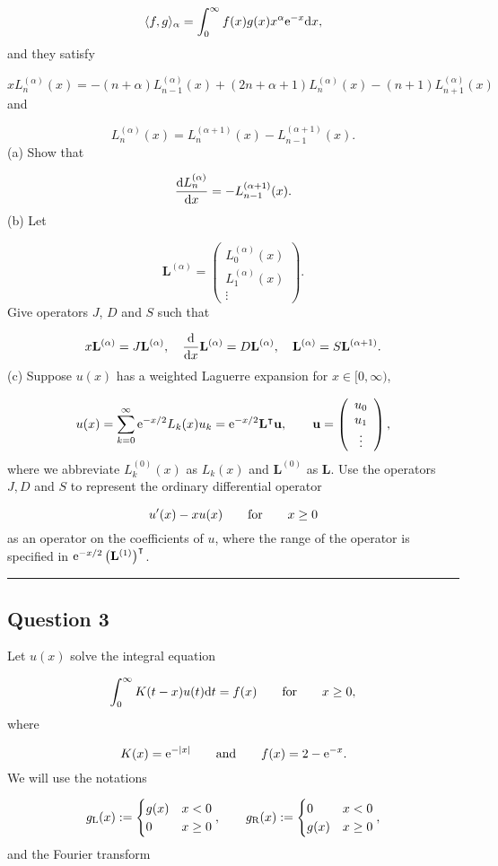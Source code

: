 \documentclass[12pt,a4paper]{article}
\def\qqfor{\qquad\hbox{for}\qquad}
\def\D{ {\rm d} }
\def\E{ {\rm e} }
\def\dx{\D x}
\def\dt{\D t}
\begin{document}
\[
\langle f,g\rangle_{\alpha} = \int_0^{\infty} f(x) g(x) x^{\alpha} \E^{-x}\D x,
\]
and they satisfy

\[
x L_n^{(\alpha)}(x) = - (n+\alpha)L_{n-1}^{(\alpha)}(x) + (2n+\alpha+1) L_n^{(\alpha)}(x) -(n+1)L_{n+1}^{(\alpha)}(x)
\]
and

\[
L_n^{(\alpha)}(x) = L_n^{(\alpha+1)}(x) - L_{n-1}^{(\alpha +1)}(x).
\]
(a) Show that

\[
{\D L_n^{(\alpha)} \over \dx}  = -L_{n-1}^{(\alpha+1)}(x).
\]
(b) Let

\[
\mathbf{L}^{(\alpha)} = \left(
\begin{array}{c}
L_0^{(\alpha)}(x) \\
L_1^{(\alpha)}(x) \\
\vdots
\end{array}
\right).
\]
Give operators $J$, $D$ and $S$ such that

\[
x\mathbf{L}^{(\alpha)} = J\mathbf{L}^{(\alpha)}, \quad
{\D\over \D x}\mathbf{L}^{(\alpha)} = D\mathbf{L}^{(\alpha)}, \quad
\mathbf{L}^{(\alpha)} = S \mathbf{L}^{(\alpha+1)}.
\]
(c) Suppose $u(x)$ has a weighted Laguerre expansion for $x \in [0, \infty)$,

\[
u(x) = \sum_{k = 0}^{\infty}\E^{-x/2}L_k(x)u_k = \E^{-x/2}\mathbf{L}^{\intercal}\mathbf{u}, \qquad
\mathbf{u} = \left(
\begin{array}{c}
u_0 \\
u_1 \\
\vdots
\end{array}
\right),
\]
where we abbreviate $L_k^{(0)}(x)$ as $L_k(x)$ and $\mathbf{L}^{(0)}$ as $\mathbf{L}$. Use the operators $J, D$ and $S$ to represent the ordinary differential operator

\[
u'(x) - x u(x)  \qqfor x \geq 0
\]
as an operator on the coefficients of $u$, where the range of the operator is specified in $\E^{-x/2} \left(\mathbf{L}^{(1)}\right)^{\intercal}$.

\rule{\textwidth}{1pt}
\subsection{Question 3}
Let $u(x)$ solve the integral equation

\[
\int_0^\infty K(t-x) u(t) \dt = f(x) \qquad \hbox{for} \qquad x \geq 0,
\]
where

\[
K(x) = \E^{-|x|}	\qquad \hbox{and}\qquad f(x) = 2 - \E^{-x}.
\]
We will use the notations

\[
g_{\rm L}(x) :=  \begin{cases} g(x) & x< 0 \\ 0 & x \geq 0  \end{cases}, \qquad
g_{\rm R}(x) := \begin{cases}  0 & x < 0 \\ g(x) &x \geq 0 \end{cases},
\]
and the Fourier transform
\end{document}
